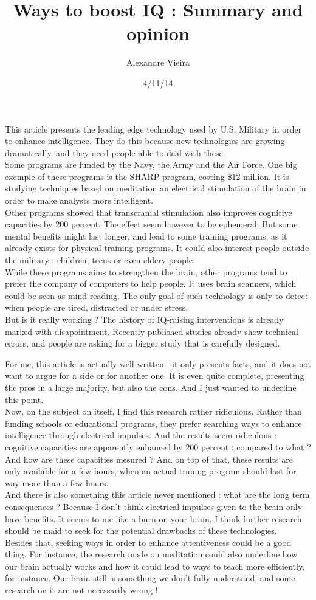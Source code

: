 \documentclass{article}
\title{Ways to boost IQ : Summary and opinion}
\author{Alexandre Vieira}
\date{4/11/14}
\begin{document}
\maketitle
This article presents the leading edge technology used by U.S. Military in order to enhance intelligence. They do this because new technologies are growing dramatically, and they need people able to deal with these.\\
Some programs are funded by the Navy, the Army and the Air Force. One big exemple of these programs is the SHARP program, costing \$12 million. It is studying techniques based on meditation an electrical stimulation of the brain in order to make analysts more intelligent.\\
Other programs showed that transcranial stimulation also improves cognitive capacities by 200 percent. The effect seem however to be ephemeral. But some mental benefits might last longer, and lead to some training programs, as it already exists for physical training programs. It could also interest people outside the military : children, teens or even eldery people.\\
While these programs aims to strengthen the brain, other programs tend to prefer the company of computers to help people. It uses brain scanners, which could be seen as mind reading. The only goal of such technology is only to detect when people are tired, distracted or under stress.\\
But is it really working ? The history of IQ-raising interventions is already marked with disapointment. Recently published studies already show technical errors, and people are asking for a bigger study that is carefully designed.

\bigskip
For me, this article is actually well written : it only presents facts, and it does not want to argue for a side or for another one. It is even quite complete, presenting the pros in a large majority, but also the cons. And I just wanted to underline this point.\\
Now, on the subject on itself, I find this research rather ridiculous. Rather than funding schools or educational programs, they prefer searching ways to enhance intelligence through electrical impulses. And the results seem ridiculous : cognitive capacities are apparently enhanced by 200 percent : compared to what ? And how are these capacities mesured ? And on top of that, these results are only available for a few hours, when an actual traning program should last for way more than a few hours. \\
And there is also something this article never mentioned : what are the long term consequences ? Because I don't think electrical impulses given to the brain only have benefits. It seems to me like a burn on your brain. I think further research should be maid to seek for the potential drawbacks of these technologies.\\
Besides that, seeking ways in order to enhance attentiveness could be a good thing. For instance, the research made on meditation could also underline how our brain actually works and how it could lead to ways to teach more efficiently, for instance. Our brain still is something we don't fully understand, and some research on it are not necessarily wrong !
\end{document}
